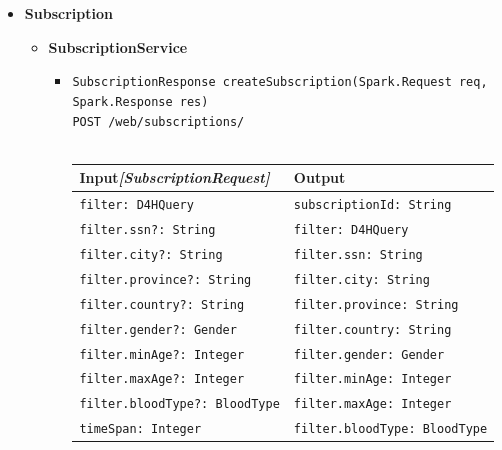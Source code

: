 \documentclass[a4paper, hidelinks, 12pt]{report}
\begin{document}
\begin{itemize}
			\item{\textbf{Subscription}}
			\begin{itemize}
				\item{\textbf{SubscriptionService}}
					\begin{itemize}
			\item{\verb|SubscriptionResponse createSubscription(Spark.Request req,|\\ \verb|Spark.Response res)|\\ \verb|POST /web/subscriptions/|}\\\\
			\begin{tabular}{l | l}
			\textbf{Input}\textit{[SubscriptionRequest]} & \textbf{Output} \\
			\hline
				\verb|filter: D4HQuery| & \verb|subscriptionId: String| \\
				\verb|filter.ssn?: String| & \verb|filter: D4HQuery| \\
				\verb|filter.city?: String| & \verb|filter.ssn: String| \\
				\verb|filter.province?: String| &  \verb|filter.city: String| \\
				\verb|filter.country?: String| &  \verb|filter.province: String| \\
				\verb|filter.gender?: Gender| & \verb|filter.country: String| \\
				\verb|filter.minAge?: Integer| &  \verb|filter.gender: Gender| \\
				\verb|filter.maxAge?: Integer| &  \verb|filter.minAge: Integer| \\
				\verb|filter.bloodType?: BloodType| &  \verb|filter.maxAge: Integer| \\
				\verb|timeSpan: Integer| &  \verb|filter.bloodType: BloodType| \\
			\end{tabular}\\
                

\end{itemize}
\end{itemize}
\end{itemize}
\end{document}
